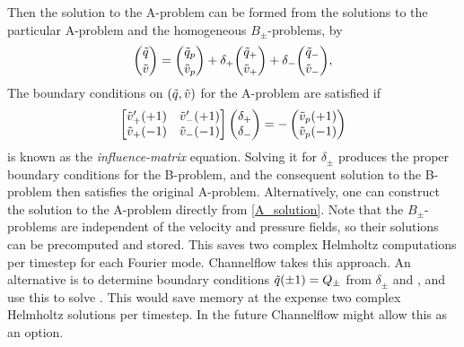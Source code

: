 \documentclass{article}[12pt]
\begin{document}
Then the solution to the A-problem can be formed from the solutions to
the particular A-problem and the homogeneous $B_{\pm}$-problems, by
\begin{align}
\binom{\tilde{q}}{\tilde{v}} = \binom{\tilde{q}_p}{\tilde{v}_p} + \delta_+ \binom{\tilde{q}_+}{\tilde{v}_+} + \delta_-\binom{\tilde{q}_-}{\tilde{v}_-}, \label{A_solution}
\end{align}
The boundary conditions on $(\tilde{q}, \tilde{v})$ for the A-problem are
satisfied if
\begin{align}
\begin{bmatrix}
\tilde{v}_+'(+1) & \tilde{v}_-'(+1) \\
\tilde{v}_+(-1) & \tilde{v}_-(-1)
\end{bmatrix}
\begin{pmatrix} \delta_+  \\ \delta_- \end{pmatrix}
=
- \begin{pmatrix} \tilde{v}_p(+1)  \\ \tilde{v}_p(-1) \end{pmatrix}
\label{influence_matrix}
\end{align}
 is known as the {\em influence-matrix} equation.
Solving it for $\delta_{\pm}$ produces the proper boundary conditions
for the B-problem, and the consequent solution to the B-problem then
satisfies the original A-problem. Alternatively, one can construct the
solution to the A-problem directly from \ref{A_solution}. Note that
the $B_{\pm}$-problems are independent of the velocity and pressure
fields, so their solutions can be precomputed and stored. This saves
two complex Helmholtz computations per timestep for each Fourier mode.
Channelflow takes this approach. An alternative is to determine boundary
conditions $\tilde{q}(\pm 1)=Q_{\pm}$ from $\delta_{\pm}$ and , and
use this to solve . This would save memory at the expense
two complex Helmholtz solutions per timestep. In the future Channelflow
might allow this as an option.

\end{document}
